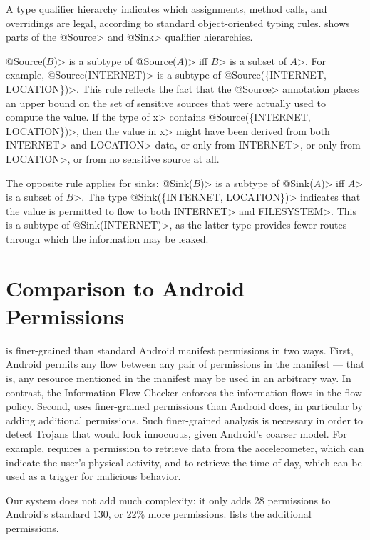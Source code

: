 A type qualifier hierarchy indicates
which assignments, method calls, and overridings are legal, according to
standard object-oriented typing rules.
 shows parts of the \<@Source> and
\<@Sink> qualifier hierarchies.


\<@Source($B$)> is a subtype of \<@Source($A$)> iff \<$B$> is a subset of \<$A$>.
For example, \<@Source(INTERNET)> is a subtype of \<@Source(\{INTERNET, LOCATION\})>.
This rule reflects the fact that the \<@Source> annotation
places an upper bound on the set of sensitive sources that were actually
used to compute the value.
If the type of \<x> contains \<@Source(\{INTERNET, LOCATION\})>, then the value
in \<x> might have been derived from both \<INTERNET> and \<LOCATION> data, or
only from \<INTERNET>, or only from \<LOCATION>, or from no
sensitive source at all.

The opposite rule applies for sinks:
\<@Sink($B$)> is a subtype of \<@Sink($A$)> iff \<$A$> is a subset of \<$B$>.
The type \<@Sink(\{INTERNET, LOCATION\})> indicates that
the value is permitted to flow to both \<INTERNET> and \<FILESYSTEM>.  This
is a subtype of \<@Sink(INTERNET)>, as the latter type provides fewer routes through which the information may be
leaked.




\section{Comparison to Android Permissions}
\label{sec:permissions}


\TheFlowChecker is finer-grained than standard Android manifest permissions
in two ways.  First, Android permits any flow
between any pair of permissions in the manifest --- that is, any resource
mentioned in the manifest may be used in an arbitrary way.
  In contrast, the Information Flow Checker enforces the information flows in the flow policy.
Second,
\theFlowChecker uses finer-grained permissions than Android does, in
particular by adding additional permissions.
Such finer-grained analysis is necessary in order to detect Trojans that would 
look innocuous, given Android's coarser model.
For example, \theFlowChecker requires 
a permission to retrieve data from the accelerometer, which can indicate the user's
physical activity, and to retrieve the time of day, which can be used
as a trigger for malicious behavior.

Our system does not add much complexity:  it only adds 28 permissions to
Android's standard 130, or 22\% more permissions.   lists
the additional permissions.

